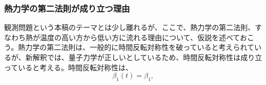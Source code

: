 \subsubsection{熱力学の第二法則が成り立つ理由}
観測問題という本稿のテーマとは少し離れるが、ここで、熱力学の第二法則、すなわち熱が温度の高い方から低い方に流れる理由について、仮説を述べておこう。熱力学の第二法則は、一般的に時間反転対称性を破っていると考えられているが、新解釈では、量子力学が正しいとしているため、時間反転対称性は成り立っていると考える。時間反転対称性は、
\begin{equation}
    \beta_1(t) = \beta_1,
\end{equation}
